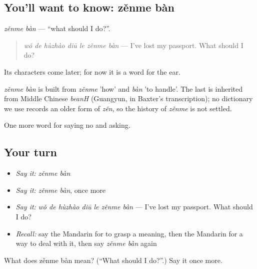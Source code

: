 \subsection*{You'll want to know: zěnme bàn}
\emph{zěnme bàn} — \textquotedblleft{}what should I do?\textquotedblright{}.

\begin{quote}
\emph{wǒ de hùzhào diū le zěnme bàn} — I've lost my passport. What should I do?
\end{quote}

Its characters come later; for now it is a word for the ear.

\begin{cousinweb}
\emph{zěnme bàn} is built from \emph{zěnme} 'how' and \emph{bàn} 'to handle'. The last is inherited from Middle Chinese \emph{beanH} (Guangyun, in Baxter's transcription); no dictionary we use records an older form of \emph{zěn}, so the history of \emph{zěnme} is not settled.
\end{cousinweb}

\begin{grammarlens}[title={What you've built}]
One more word for saying no and asking.
\end{grammarlens}

\subsection*{Your turn}
\begin{itemize}
\raggedright
  \item \emph{Say it:} \emph{zěnme bàn}
  \item \emph{Say it:} \emph{zěnme bàn}, once more
  \item \emph{Say it:} \emph{wǒ de hùzhào diū le zěnme bàn} — I've lost my passport. What should I do?
  \item \emph{Recall:} say the Mandarin for to grasp a meaning, then the Mandarin for a way to deal with it, then say \emph{zěnme bàn} again
\end{itemize}

\begin{tcolorbox}[breakable,colback=teal!4,colframe=teal!35!black,title={Before you move on}]
What does zěnme bàn mean? (\textquotedblleft{}What should I do?\textquotedblright{}.) Say it once more.
\end{tcolorbox}
